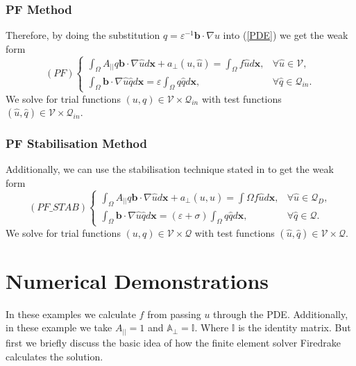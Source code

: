 \documentclass[12pt]{ociamthesis}
\begin{document}
\subsection{PF Method}
Therefore, by doing the substitution $q=\varepsilon^{-1} \mathbf{b} \cdot \nabla u$ into (\ref{PDE}) we get the weak form
\begin{equation} \label{PF_w}
(PF)
\begin{cases}
\int_{\Omega}A_{||}q\mathbf{b} \cdot \nabla \hat{u}  d\mathbf{x} + a_{\perp}(u, \hat{u}) 
= \int_{\Omega} f \hat{u} d\mathbf{x},
&\forall \hat{u} \in \mathcal{V},\\
\int_{\Omega}\mathbf{b} \cdot \nabla \hat{u}\hat{q} d\mathbf{x} 
= \varepsilon \int_{\Omega}q\hat{q} d \mathbf{x}, 
&\forall \hat{q} \in \mathcal{Q}_{in}.
\end{cases}
\end{equation}
We solve for trial functions $(u,q) \in \mathcal{V} \times \mathcal{Q}_{in}$ with test functions $(\hat{u}, \hat{q}) \in \mathcal{V} \times \mathcal{Q}_{in}$. 


\subsection{PF Stabilisation Method}
Additionally, we can use the stabilisation technique stated in \cite{STAB} to get the weak form
\begin{equation} \label{PF_STAB_w}
(PF\_STAB)
\begin{cases}
\int_{\Omega}A_{||}q\mathbf{b} \cdot \nabla \hat{u}  d\mathbf{x} + a_{\perp}(u, \hat{u}) 
= \int{\Omega} f \hat{u} d\mathbf{x},
&\forall \hat{u} \in \mathcal{Q}_D,\\
\int_{\Omega}\mathbf{b} \cdot \nabla \hat{u}\hat{q} d\mathbf{x} 
= (\varepsilon + \sigma)\int_{\Omega}q\hat{q} d \mathbf{x}, 
&\forall \hat{q} \in \mathcal{Q}.
\end{cases}
\end{equation}
We solve for trial functions $(u,q) \in \mathcal{V} \times \mathcal{Q}$ with test functions $(\hat{u}, \hat{q}) \in \mathcal{V} \times \mathcal{Q}$. 

\chapter{Numerical Demonstrations}
In these examples we calculate $f$ from passing $u$ through the PDE. Additionally, in these example we take $A_{||}=1$ and $\mathbb{A}_{\perp} = \mathbb{I}$. Where $\mathbb{I}$ is the identity matrix. But first we briefly discuss the basic idea of how the finite element solver Firedrake \cite{Dragon} calculates the solution. 
\end{document}
